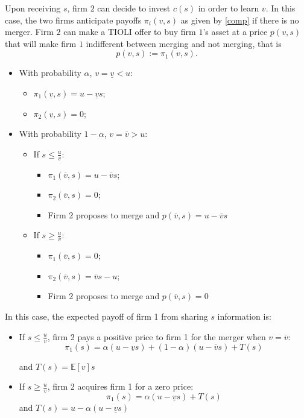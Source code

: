 \documentclass[a4paper,leqno]{article}%
\newcommand{\E}{\mathbb E}
\renewcommand{\a}{\alpha}
\newcommand{\uv}{\underline{v}}
\newcommand{\ov}{\overline{v}}
\begin{document}
Upon receiving $s$, firm $2$ can decide to invest $c(s)$ in order to learn $v$. In this case, the two firms anticipate payoffs $\pi_i(v,s)$ as given by \eqref{comp} if there is no merger. Firm $2$ can make a TIOLI offer to buy firm $1$'s asset at a price $p(v,s)$ that will make firm $1$ indifferent between merging and not merging, that is 
%
\begin{equation}\label{merger-price}
    p(v,s):=\pi_1(v,s).  
\end{equation}
%
\begin{itemize}
    \item With probability $\a$, $v=\uv<u$:

\begin{itemize}
    \item $\pi_1(\uv,s)=u-\uv s$;
    \item $\pi_2(\uv,s)=0$;
\end{itemize}
    \item With probability $1-\a$, $v=\ov>u$:

\begin{itemize}
    \item If $s\leq \frac{u}{\ov}$:
\begin{itemize}
    \item $\pi_1(\ov,s)=u-\ov s$;
    \item $\pi_2(\ov,s)=0$;
    \item Firm 2 proposes to merge and $p(\ov,s)=u-\ov s$
\end{itemize}
    \item If $s\geq \frac{u}{\ov}$:
\begin{itemize}
    \item $\pi_1(\ov,s)=0$;
    \item $\pi_2(\ov,s)=\ov s-u$;
    \item Firm 2 proposes to merge and $p(\ov,s)=0$
\end{itemize}
\end{itemize}

\end{itemize}

In this case, the expected payoff of firm 1 from sharing $s$ information is:

\begin{itemize}
    \item If $s\leq \frac{u}{\ov}$, firm 2 pays a positive price to firm 1 for the merger when $v=\ov$:
    $$\pi_1(s)=\a(u-\uv s)+(1-\a)(u-\ov s)+T(s)$$
    
    and $T(s)=\E[v]s$
    \item If $s\geq \frac{u}{\ov}$, firm 2 acquires firm 1 for a zero price:
    $$\pi_1(s)=\a(u-\uv s)+T(s)$$
    and $T(s)=u-\a(u-\uv s)$
\end{itemize}
\end{document}

